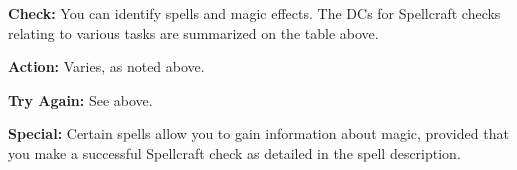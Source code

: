 \textbf{Check:} You can identify spells and magic effects. The DCs for Spellcraft checks relating to various tasks are summarized on the table above.

\textbf{Action:} Varies, as noted above.

\textbf{Try Again:} See above.

\textbf{Special:} Certain spells allow you to gain information about magic, provided that you make a successful Spellcraft check as detailed in the spell description.
